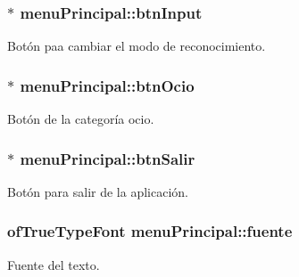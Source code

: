 \subsubsection[{btn\+Input}]{$\ast$ menu\+Principal\+::btn\+Input}\label{classmenu_principal_aea487ca8d9e0d1df2fda6a563ca0f04c}


Botón paa cambiar el modo de reconocimiento. 

\hypertarget{classmenu_principal_a488846721d51f37a0ce23bb19372c0b1}{}
\subsubsection[{btn\+Ocio}]{$\ast$ menu\+Principal\+::btn\+Ocio\hspace{0.3cm}{\ttfamily [private]}}\label{classmenu_principal_a488846721d51f37a0ce23bb19372c0b1}


Botón de la categoría ocio. 

\hypertarget{classmenu_principal_a9415d04ae2ac0a7927c32c95acdcb9ca}{}
\subsubsection[{btn\+Salir}]{$\ast$ menu\+Principal\+::btn\+Salir\hspace{0.3cm}{\ttfamily [private]}}\label{classmenu_principal_a9415d04ae2ac0a7927c32c95acdcb9ca}


Botón para salir de la aplicación. 

\hypertarget{classmenu_principal_a23f1de2b0d66522eae4ce63763d31ce6}{}
\subsubsection[{fuente}]{\setlength{\rightskip}{0pt plus 5cm}of\+True\+Type\+Font menu\+Principal\+::fuente\hspace{0.3cm}{\ttfamily [private]}}\label{classmenu_principal_a23f1de2b0d66522eae4ce63763d31ce6}


Fuente del texto. 

